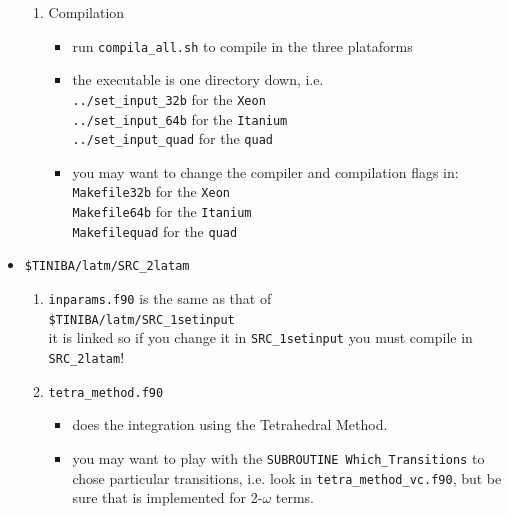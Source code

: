 \documentclass[12pt,leqno]{article}
\numberwithin{equation}{section}
\begin{document}
\begin{itemize}
\begin{enumerate}
\item Compilation
\begin{itemize}
\item run \verb=compila_all.sh= to compile in the three plataforms
\item the executable is one directory down, i.e.\\
\verb=../set_input_32b= for the \verb=Xeon=\\
\verb=../set_input_64b= for the \verb=Itanium=\\
\verb=../set_input_quad= for the \verb=quad=
\item you may want to change the compiler and compilation flags in:\\
\verb=Makefile32b= for the \verb=Xeon=\\
\verb=Makefile64b= for the \verb=Itanium=\\
\verb=Makefilequad= for the \verb=quad=
\end{itemize}

\end{enumerate}

\item\verb=$TINIBA/latm/SRC_2latam=
\begin{enumerate}
\item\verb=inparams.f90= is the same as that of\\
\verb=$TINIBA/latm/SRC_1setinput=\\
it is linked so if you change it in \verb=SRC_1setinput=
 you must compile in \verb=SRC_2latam=!
\item \verb=tetra_method.f90=
\begin{itemize}
\item does the integration using the Tetrahedral Method.
\item you may want to play with the 
\verb=SUBROUTINE Which_Transitions= to chose particular transitions,
i.e. look in \verb=tetra_method_vc.f90=, but be sure that is
implemented for 2-$\omega$ terms.
\end{itemize}


\end{enumerate}
\end{itemize}
\end{document}
